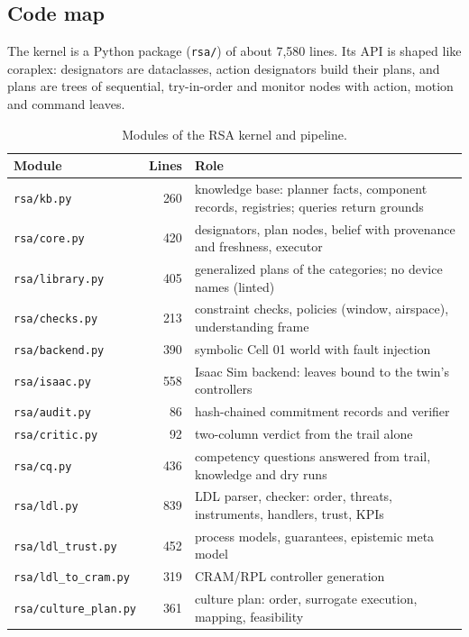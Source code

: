 \documentclass[10pt,a4paper]{article}
\begin{document}
\subsection{Code map}\label{sec:files}

The kernel is a Python package (\texttt{rsa/}) of about 7,580 lines. Its API is shaped like coraplex: designators are dataclasses, action designators build their plans, and plans are trees of sequential, try-in-order and monitor nodes with action, motion and command leaves.

\begin{table}[tbp]\centering\small
\caption{Modules of the RSA kernel and pipeline.}\label{tab:files}
\begin{tabularx}{\linewidth}{p{3.6cm}rX}\toprule
\textbf{Module} & \textbf{Lines} & \textbf{Role} \\\midrule
\texttt{rsa/kb.py} & 260 & knowledge base: planner facts, component records, registries; queries return grounds \\
\texttt{rsa/core.py} & 420 & designators, plan nodes, belief with provenance and freshness, executor \\
\texttt{rsa/library.py} & 405 & generalized plans of the categories; no device names (linted) \\
\texttt{rsa/checks.py} & 213 & constraint checks, policies (window, airspace), understanding frame \\
\texttt{rsa/backend.py} & 390 & symbolic Cell 01 world with fault injection \\
\texttt{rsa/isaac.py} & 558 & Isaac Sim backend: leaves bound to the twin's controllers \\
\texttt{rsa/audit.py} & 86 & hash-chained commitment records and verifier \\
\texttt{rsa/critic.py} & 92 & two-column verdict from the trail alone \\
\texttt{rsa/cq.py} & 436 & competency questions answered from trail, knowledge and dry runs \\
\texttt{rsa/ldl.py} & 839 & LDL parser, checker: order, threats, instruments, handlers, trust, KPIs \\
\texttt{rsa/ldl\_\allowbreak{}trust.py} & 452 & process models, guarantees, epistemic meta model \\
\texttt{rsa/ldl\_\allowbreak{}to\_\allowbreak{}cram.py} & 319 & CRAM/RPL controller generation \\
\texttt{rsa/culture\_\allowbreak{}plan.py} & 361 & culture plan: order, surrogate execution, mapping, feasibility \\

\end{tabularx}
\end{table}
\end{document}
